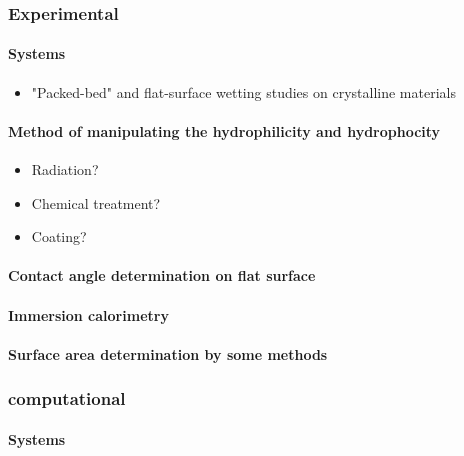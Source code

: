 \documentclass[a4paper,12pt,single,pdftex]{article}
\begin{document}
\label{ID_176697614}\subsubsection{Experimental}

\label{ID_222214319}\paragraph{Systems}

\begin{itemize}
\label{ID_890750199}\item "Packed-bed" and flat-surface wetting studies on crystalline materials
\end{itemize}
\label{ID_890750199}\label{ID_1528992532}\paragraph{Method of manipulating the hydrophilicity and hydrophocity}

\begin{itemize}
\label{ID_630039349}\item Radiation?
\label{ID_1162892636}\item Chemical treatment?
\label{ID_1113661769}\item Coating?
\end{itemize}
\label{ID_630039349}\label{ID_1162892636}\label{ID_1113661769}\label{ID_768785223}\paragraph{Contact angle determination on flat surface}

\label{ID_1121131843}\paragraph{Immersion calorimetry}

\label{ID_627706002}\paragraph{Surface area determination by some methods}

\label{ID_872435313}\subsubsection{computational}

\label{ID_1103117492}\paragraph{Systems}
\end{document}
